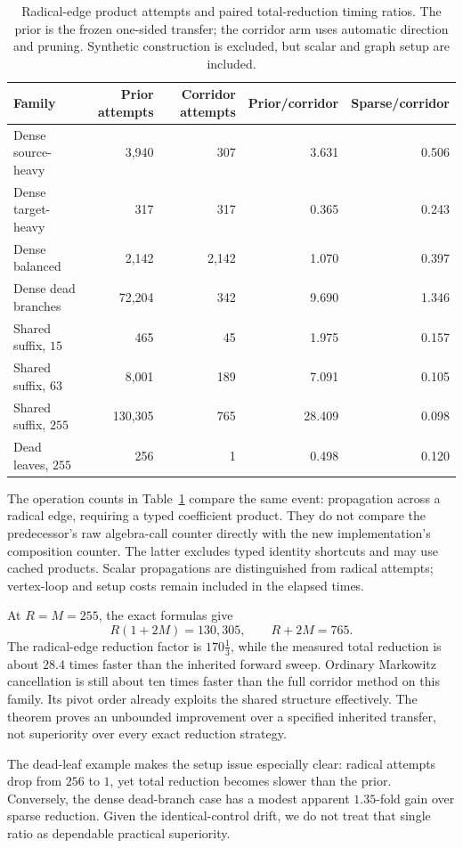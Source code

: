 \begin{table}[htbp]
\centering
\small
\setlength{\tabcolsep}{5pt}
\begin{tabular}{@{}lrrrr@{}}
\toprule
Family & Prior attempts & Corridor attempts &
Prior/corridor & Sparse/corridor\\
\midrule
Dense source-heavy & 3,940 & 307 & 3.631 & 0.506\\
Dense target-heavy & 317 & 317 & 0.365 & 0.243\\
Dense balanced & 2,142 & 2,142 & 1.070 & 0.397\\
Dense dead branches & 72,204 & 342 & 9.690 & 1.346\\
Shared suffix, \(15\) & 465 & 45 & 1.975 & 0.157\\
Shared suffix, \(63\) & 8,001 & 189 & 7.091 & 0.105\\
Shared suffix, \(255\) & 130,305 & 765 & 28.409 & 0.098\\
Dead leaves, \(255\) & 256 & 1 & 0.498 & 0.120\\
\bottomrule
\end{tabular}
\caption{Radical-edge product attempts and paired total-reduction
timing ratios. The prior is the frozen one-sided transfer; the
corridor arm uses automatic direction and pruning. Synthetic
construction is excluded, but scalar and graph setup are included.}
\label{tab:kernel-corridor}
\end{table}

The operation counts in Table~\ref{tab:kernel-corridor} compare the
same event: propagation across a radical edge, requiring a typed
coefficient product. They do not compare the predecessor's raw
algebra-call counter directly with the new implementation's
composition counter. The latter excludes typed identity shortcuts
and may use cached products. Scalar propagations are distinguished
from radical attempts; vertex-loop and setup costs remain included
in the elapsed times.

At \(R=M=255\), the exact formulas give
\[
 R(1+2M)=130{,}305,\qquad R+2M=765.
\]
The radical-edge reduction factor is \(170\frac13\), while the
measured total reduction is about \(28.4\) times faster than the
inherited forward sweep. Ordinary Markowitz cancellation is still
about ten times faster than the full corridor method on this
family. Its pivot order already exploits the shared structure
effectively. The theorem proves an unbounded improvement over a
specified inherited transfer, not superiority over every exact
reduction strategy.

The dead-leaf example makes the setup issue especially clear:
radical attempts drop from \(256\) to \(1\), yet total reduction
becomes slower than the prior. Conversely, the dense dead-branch
case has a modest apparent \(1.35\)-fold gain over sparse reduction.
Given the identical-control drift, we do not treat that single
ratio as dependable practical superiority.


